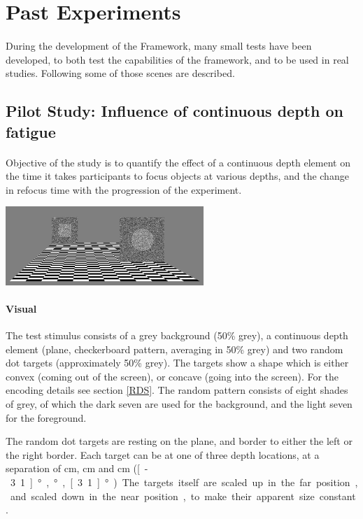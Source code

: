 \section{Past Experiments}
\paragraph{}
During the development of the Framework, many small tests have been developed, to both test the capabilities of the framework, and to be used in real studies.
Following some of those scenes are described.

\subsection[Influence of continuous depth]{Pilot Study: Influence of continuous depth on fatigue\label{FatiguePilot}}
\paragraph{}
Objective of the study is to quantify the effect of a continuous depth element on the time it takes participants to focus objects at various depths, and the change in refocus time with the progression of the experiment.

\begin{center}
\includegraphics[width=7.5cm]{media/pilotFatigue.png}
\end{center}

\paragraph{Visual}
The test stimulus consists of a grey background (50\% grey), a continuous depth element (plane, checkerboard pattern, averaging in 50\% grey) and two random dot targets (approximately 50\% grey).
The targets show a shape which is either convex (coming out of the screen), or concave (going into the screen).
For the encoding details see section \ref{RDS}. The random pattern consists of eight shades of grey, of which the dark seven are used for the background, and the light seven for the foreground.

The random dot targets are resting on the plane, and border to either the left or the right border.
Each target can be at  one of three depth locations, at a separation of \unit[6]{cm}, \unit[0]{cm} and \unit[-6]{cm} (\unit[-3.1]{°}, \unit[0]{°}, \unit[3.1]{°}).
The targets itself are scaled up in the far position, and scaled down in the near position, to make their apparent size constant.

